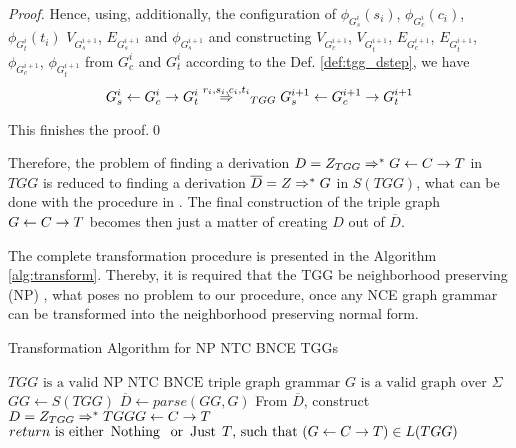 \documentclass[runningheads]{llncs}
\begin{document}
\begin{proof}
	Hence, using, additionally, the configuration of $\phi_{G^i_s}(s_i)$, $\phi_{G^i_c}(c_i)$, $\phi_{G^i_t}(t_i)$ $V_{G^{i+1}_s}$, $E_{G^{i+1}_s}$ and $\phi_{G^{i+1}_s}$ and constructing $V_{G^{i+1}_c}$, $V_{G^{i+1}_t}$, $E_{G^{i+1}_c}$, $E_{G^{i+1}_t}$, $\phi_{G^{i+1}_c}$, $\phi_{G^{i+1}_t}$ from $G^i_c$ and $G^i_t$ according to the Def. \ref{def:tgg_dstep}, we have 
	\begin{equation*}
		G^i_s \ms{} G^i_c \mt{} G^i_t \tderiv{r_i}{s_i,c_i,t_i}{TGG} G^{i+1}_s \ms{} G^{i+1}_c \mt{} G^{i+1}_t
	\end{equation*}
	
	This finishes the proof.\qed
\end{proof}

Therefore, the problem of finding a derivation $D = Z_{TGG} \Rightarrow^*_{}{}{} G \overset{}{\leftarrow} C \overset{}{\rightarrow} T$ in $TGG$ is reduced to finding a derivation $\overline{D} = Z_{} \Rightarrow^*_{}{}{} G$ in $S(TGG)$, what can be done with the procedure in \cite{rozenberg1986boundary}. The final construction of the triple graph $G \overset{}{\leftarrow} C \overset{}{\rightarrow} T$ becomes then just a matter of creating $D$ out of $\overline{D}$.

The complete transformation procedure is presented in the Algorithm \ref{alg:transform}. Thereby, it is required that the TGG be neighborhood preserving (NP) \cite{rozenberg1986boundary,skodinis1998neighborhood}, what poses no problem to our procedure, once any NCE graph grammar can be transformed into the neighborhood preserving normal form. 
\begin{algorithm}[h]
	\caption{Transformation Algorithm for NP NTC BNCE TGGs}
	\begin{algorithmic}[!h]
		\Require $TGG \text{ is a valid NP NTC BNCE triple graph grammar}$
		\Require $G \text{ is a valid graph over } \Sigma$
		\State $GG \gets S(TGG)$ 
		\State $\overline{D} \gets parse(GG,G)$ 
		 
		\State From $\overline{D}$, construct $D = Z_{TGG} \Rightarrow^*_{}{}{TGG} G \overset{}{\leftarrow} C \overset{}{\rightarrow} T$  
		\State {}
		\Else
		\State \Return {$\Nothing$} 
		\EndIf
		\EndFunction 
		\Ensure $return \text{ is either } \operatorname{\text{Nothing}}\; \text{ or } \operatorname{\text{Just}}\; T \text{, such that } (G \overset{}{\leftarrow} C \overset{}{\rightarrow} T) \in L(TGG)$
	\end{algorithmic}
	\label{alg:transform}
\end{algorithm}
\end{document}
